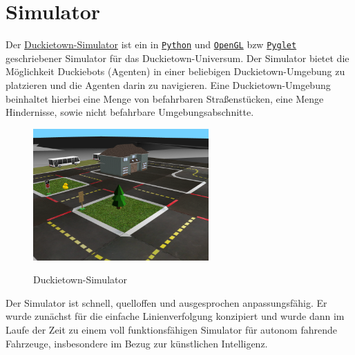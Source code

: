 \section{Simulator}

Der \href{https://github.com/duckietown/gym-duckietown}{Duckietown-Simulator} ist ein in \href{https://www.python.org/}{\texttt{Python}} und \href{https://www.opengl.org/}{\texttt{OpenGL}} \acf{bzw} \href{http://pyglet.org/}{\texttt{Pyglet}} geschriebener Simulator für das \glqq Duckietown-Universum\grqq. Der Simulator bietet die Möglichkeit Duckiebots (Agenten) in einer beliebigen Duckietown-Umgebung zu platzieren und die Agenten darin zu navigieren. Eine Duckietown-Umgebung beinhaltet hierbei eine Menge von befahrbaren Straßenstücken, eine Menge Hindernisse, sowie nicht befahrbare Umgebungsabschnitte. \cite{gym_duckietown} \\

\begin{figure}[H]
	\centering
	\includegraphics[width=0.6\textwidth]{kapitel2/images/duckietown-gym.png}
	\label{fig:duckietown-gym}
	\caption{Duckietown-Simulator}
\end{figure}

Der Simulator ist schnell, quelloffen und ausgesprochen anpassungsfähig. Er wurde zunächst für die einfache Linienverfolgung konzipiert und wurde dann im Laufe der Zeit zu einem voll funktionsfähigen Simulator für autonom fahrende Fahrzeuge, insbesondere im Bezug zur künstlichen Intelligenz. \cite{gym_duckietown}

